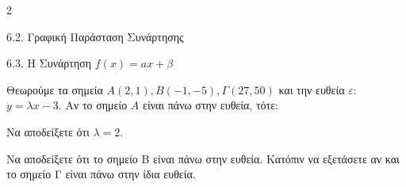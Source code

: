 \begin{ylh}{2}
    \item 6.2. Γραφική Παράσταση Συνάρτησης
    \item 6.3. Η Συνάρτηση $f(x)=ax+\beta$
\end{ylh}
Θεωρούμε τα σημεία $A(2, 1), B(-1, -5), \Gamma(27, 50)$ και την ευθεία $\varepsilon$: $y = \lambda x - 3$. Αν το σημείο $A$ είναι πάνω στην ευθεία, τότε:
\begin{alist}
\item Να αποδείξετε ότι $\lambda = 2$.
\item Να αποδείξετε ότι το σημείο Β είναι πάνω στην ευθεία. Κατόπιν να εξετάσετε αν και το σημείο Γ είναι πάνω στην ίδια ευθεία.

\end{alist}

